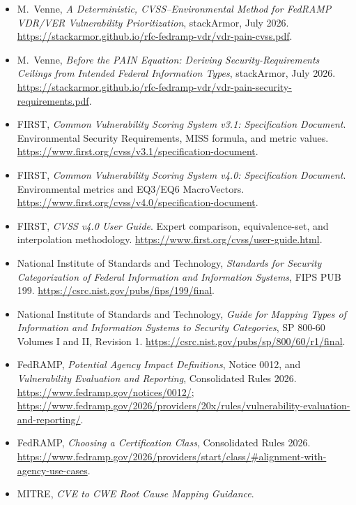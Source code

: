 \documentclass[11pt]{article}
\begin{document}
{\small
\begin{itemize}[leftmargin=3.2em,itemsep=0.3em,topsep=0.4em]
\item[{[PAIN]}] M.~Venne, \emph{A Deterministic, CVSS--Environmental Method for
  FedRAMP VDR/VER Vulnerability Prioritization}, stackArmor, July 2026.
  \url{https://stackarmor.github.io/rfc-fedramp-vdr/vdr-pain-cvss.pdf}.
\item[{[CEILING]}] M.~Venne, \emph{Before the PAIN Equation: Deriving
  Security-Requirements Ceilings from Intended Federal Information Types},
  stackArmor, July 2026.
  \url{https://stackarmor.github.io/rfc-fedramp-vdr/vdr-pain-security-requirements.pdf}.
\item[{[CVSS31]}] FIRST, \emph{Common Vulnerability Scoring System v3.1:
  Specification Document}. Environmental Security Requirements, MISS formula, and
  metric values. \url{https://www.first.org/cvss/v3.1/specification-document}.
\item[{[CVSS40]}] FIRST, \emph{Common Vulnerability Scoring System v4.0:
  Specification Document}. Environmental metrics and EQ3/EQ6 MacroVectors.
  \url{https://www.first.org/cvss/v4.0/specification-document}.
\item[{[CVSS40-UG]}] FIRST, \emph{CVSS v4.0 User Guide}. Expert comparison,
  equivalence-set, and interpolation methodology.
  \url{https://www.first.org/cvss/user-guide.html}.
\item[{[FIPS199]}] National Institute of Standards and Technology,
  \emph{Standards for Security Categorization of Federal Information and
  Information Systems}, FIPS PUB 199.
  \url{https://csrc.nist.gov/pubs/fips/199/final}.
\item[{[SP800-60]}] National Institute of Standards and Technology,
  \emph{Guide for Mapping Types of Information and Information Systems to Security
  Categories}, SP 800-60 Volumes I and II, Revision 1.
  \url{https://csrc.nist.gov/pubs/sp/800/60/r1/final}.
\item[{[FEDRAMP]}] FedRAMP, \emph{Potential Agency Impact Definitions},
  Notice 0012, and \emph{Vulnerability Evaluation and Reporting}, Consolidated
  Rules 2026.
  \url{https://www.fedramp.gov/notices/0012/};
  \url{https://www.fedramp.gov/2026/providers/20x/rules/vulnerability-evaluation-and-reporting/}.
\item[{[FEDRAMP-CLASS]}] FedRAMP,
  \emph{Choosing a Certification Class}, Consolidated Rules 2026.
  \url{https://www.fedramp.gov/2026/providers/start/class/#alignment-with-agency-use-cases}.
\item[{[CWE-RCM]}] MITRE, \emph{CVE to CWE Root Cause Mapping Guidance}.

\end{itemize}}
\end{document}
